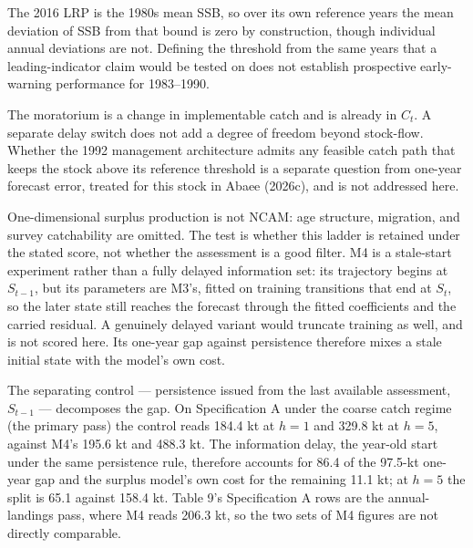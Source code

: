 \documentclass[11pt]{article}
\begin{document}
The 2016 LRP is the 1980s mean SSB, so over its own reference years the
mean deviation of SSB from that bound is zero by construction, though
individual annual deviations are not. Defining the threshold from the
same years that a leading-indicator claim would be tested on does not
establish prospective early-warning performance for 1983--1990.

The moratorium is a change in implementable catch and is already in
\(C_t\). A separate delay switch does not add a degree of freedom beyond
stock-flow. Whether the 1992 management architecture admits any feasible
catch path that keeps the stock above its reference threshold is a
separate question from one-year forecast error, treated for this stock
in Abaee (2026c), and is not addressed
here.

One-dimensional surplus production is not NCAM: age structure,
migration, and survey catchability are omitted. The test is whether this
ladder is retained under the stated score, not whether the assessment is
a good filter. M4 is a stale-start experiment rather than a fully delayed information
set: its trajectory begins at \(S_{t-1}\), but its parameters are
M3's, fitted on training transitions that end at \(S_t\), so the
later state still reaches the forecast through the fitted coefficients
and the carried residual. A genuinely delayed variant would truncate
training as well, and is not scored here. Its one-year gap against
persistence therefore mixes a stale initial state with the model's own
cost.

The separating control --- persistence issued from the last available
assessment, \(S_{t-1}\) --- decomposes the gap. On Specification A under
the coarse catch regime (the primary pass) the control reads 184.4 kt at
\(h = 1\) and 329.8 kt at \(h = 5\), against M4's 195.6 kt and 488.3 kt.
The information delay, the year-old start under the same persistence
rule, therefore accounts for 86.4 of the 97.5-kt one-year gap and the
surplus model's own cost for the remaining 11.1 kt; at \(h = 5\) the
split is 65.1 against 158.4 kt. Table 9's Specification A rows are the
annual-landings pass, where M4 reads 206.3 kt, so the two sets of M4
figures are not directly comparable.
\end{document}
